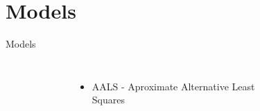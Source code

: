 \documentclass{beamer}
\begin{document}
\section{Models}
\begin{frame}{Models}
\begin{columns}[c] %


\begin{figure}%
    \centering
\end{figure}
\vspace{30px}
\begin{itemize}
    \item AALS - Aproximate Alternative Least Squares 
\end{itemize}


\begin{figure}%
    \centering
\end{figure}


\end{columns}
\end{frame}
\end{document}
